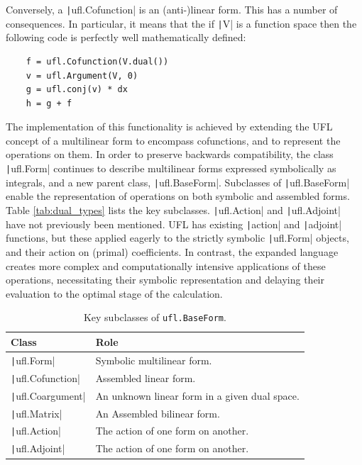 \documentclass[a4paper,11pt]{article}
\begin{document}
Conversely, a \texttt|ufl.Cofunction| is an (anti-)linear form. This has a number of consequences. In particular, it means that the if \texttt|V| is a function space then the following code is perfectly well mathematically defined:
\begin{verbatim}
    f = ufl.Cofunction(V.dual())
    v = ufl.Argument(V, 0)
    g = ufl.conj(v) * dx
    h = g + f
\end{verbatim}
The implementation of this functionality is achieved by extending the UFL concept of a multilinear form to encompass cofunctions, and to represent the operations on them. In order to preserve backwards compatibility, the class \texttt|ufl.Form| continues to describe multilinear forms expressed symbolically as integrals, and a new parent class, \texttt|ufl.BaseForm|. Subclasses of \texttt|ufl.BaseForm| enable the representation of operations on both symbolic and assembled forms. Table \ref{tab:dual_types} lists the key subclasses. \texttt|ufl.Action| and \texttt|ufl.Adjoint| have not previously been mentioned. UFL has existing \texttt|action| and \texttt|adjoint| functions, but these applied eagerly to the strictly symbolic \texttt|ufl.Form| objects, and their action on (primal) coefficients. In contrast, the expanded language creates more complex and computationally intensive applications of these operations, necessitating their symbolic representation and delaying their evaluation to the optimal stage of the calculation.  

\begin{table}[htbp]
    \centering
    \begin{tabular}{ll}
        Class & Role \\\hline
        \texttt|ufl.Form| & Symbolic multilinear form.\\
        \texttt|ufl.Cofunction| & Assembled linear form.\\
        \texttt|ufl.Coargument| & An unknown linear form in a given dual space.\\
        \texttt|ufl.Matrix| & An Assembled bilinear form.\\
        \texttt|ufl.Action| & The action of one form on another.\\
        \texttt|ufl.Adjoint| & The action of one form on another.
    \end{tabular}
    \caption{Key subclasses of \texttt{ufl.BaseForm}.}
    \label{tab:baseform_subclasses}
\end{table}
\end{document}
